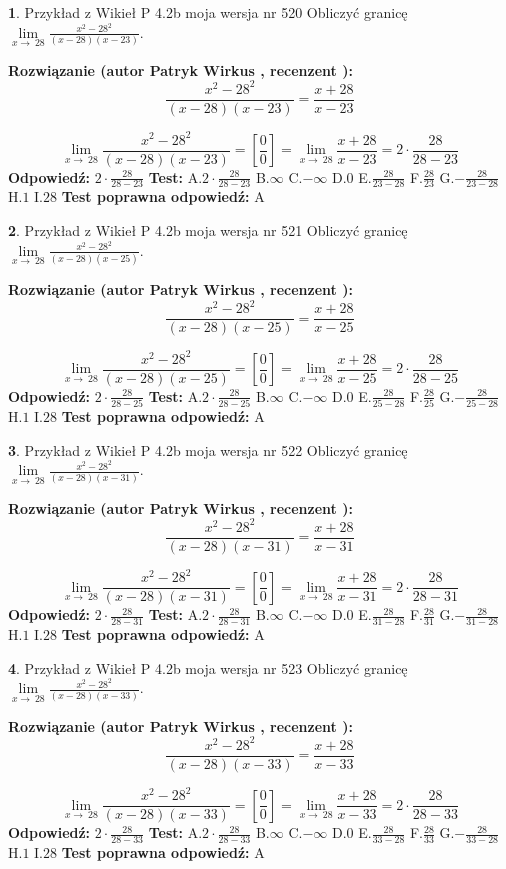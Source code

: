 \documentclass[12pt, a4paper]{article}
\theoremstyle{definition} %
\newtheorem{zad}{}
\newcommand{\zadStart}[1]{\begin{zad}#1\newline}
\newcommand{\zadStop}{\end{zad}}
\newcommand{\rozwStart}[2]{\noindent \textbf{Rozwiązanie (autor #1 , recenzent #2): }\newline}
\newcommand{\rozwStop}{\newline}
\newcommand{\odpStart}{\noindent \textbf{Odpowiedź:}\newline}
\newcommand{\odpStop}{\newline}
\newcommand{\testStart}{\noindent \textbf{Test:}\newline}
\newcommand{\testStop}{\newline}
\newcommand{\kluczStart}{\noindent \textbf{Test poprawna odpowiedź:}\newline}
\newcommand{\kluczStop}{\newline}
\begin{document}
\zadStart{Przykład z Wikieł P 4.2b moja wersja nr 520}
Obliczyć granicę $\lim\limits_{x\to\ 28}\frac{x^{2}-28^{2}}{(x-28)(x-23)}$.
\zadStop
\rozwStart{Patryk Wirkus}{}
$$\frac{x^{2}-28^{2}}{(x-28)(x-23)}=\frac{x+28}{x-23}$$

$$\lim\limits_{x\to\ 28}\frac{x^{2}-28^{2}}{(x-28)(x-23)}=[\frac{0}{0}]=\lim\limits_{x\to\ 28}\frac{x+28}{x-23}=2 \cdot \frac{28}{28-23}$$
\rozwStop
\odpStart
$2 \cdot \frac{28}{28-23}$
\odpStop
\testStart
A.$2 \cdot \frac{28}{28-23}$
B.$\infty$
C.$-\infty$
D.$0$
E.$\frac{28}{23-28}$
F.$\frac{28}{23}$
G.$-\frac{28}{23-28}$
H.$1$
I.$28$
\testStop
\kluczStart
A
\kluczStop



\zadStart{Przykład z Wikieł P 4.2b moja wersja nr 521}
Obliczyć granicę $\lim\limits_{x\to\ 28}\frac{x^{2}-28^{2}}{(x-28)(x-25)}$.
\zadStop
\rozwStart{Patryk Wirkus}{}
$$\frac{x^{2}-28^{2}}{(x-28)(x-25)}=\frac{x+28}{x-25}$$

$$\lim\limits_{x\to\ 28}\frac{x^{2}-28^{2}}{(x-28)(x-25)}=[\frac{0}{0}]=\lim\limits_{x\to\ 28}\frac{x+28}{x-25}=2 \cdot \frac{28}{28-25}$$
\rozwStop
\odpStart
$2 \cdot \frac{28}{28-25}$
\odpStop
\testStart
A.$2 \cdot \frac{28}{28-25}$
B.$\infty$
C.$-\infty$
D.$0$
E.$\frac{28}{25-28}$
F.$\frac{28}{25}$
G.$-\frac{28}{25-28}$
H.$1$
I.$28$
\testStop
\kluczStart
A
\kluczStop



\zadStart{Przykład z Wikieł P 4.2b moja wersja nr 522}
Obliczyć granicę $\lim\limits_{x\to\ 28}\frac{x^{2}-28^{2}}{(x-28)(x-31)}$.
\zadStop
\rozwStart{Patryk Wirkus}{}
$$\frac{x^{2}-28^{2}}{(x-28)(x-31)}=\frac{x+28}{x-31}$$

$$\lim\limits_{x\to\ 28}\frac{x^{2}-28^{2}}{(x-28)(x-31)}=[\frac{0}{0}]=\lim\limits_{x\to\ 28}\frac{x+28}{x-31}=2 \cdot \frac{28}{28-31}$$
\rozwStop
\odpStart
$2 \cdot \frac{28}{28-31}$
\odpStop
\testStart
A.$2 \cdot \frac{28}{28-31}$
B.$\infty$
C.$-\infty$
D.$0$
E.$\frac{28}{31-28}$
F.$\frac{28}{31}$
G.$-\frac{28}{31-28}$
H.$1$
I.$28$
\testStop
\kluczStart
A
\kluczStop



\zadStart{Przykład z Wikieł P 4.2b moja wersja nr 523}
Obliczyć granicę $\lim\limits_{x\to\ 28}\frac{x^{2}-28^{2}}{(x-28)(x-33)}$.
\zadStop
\rozwStart{Patryk Wirkus}{}
$$\frac{x^{2}-28^{2}}{(x-28)(x-33)}=\frac{x+28}{x-33}$$

$$\lim\limits_{x\to\ 28}\frac{x^{2}-28^{2}}{(x-28)(x-33)}=[\frac{0}{0}]=\lim\limits_{x\to\ 28}\frac{x+28}{x-33}=2 \cdot \frac{28}{28-33}$$
\rozwStop
\odpStart
$2 \cdot \frac{28}{28-33}$
\odpStop
\testStart
A.$2 \cdot \frac{28}{28-33}$
B.$\infty$
C.$-\infty$
D.$0$
E.$\frac{28}{33-28}$
F.$\frac{28}{33}$
G.$-\frac{28}{33-28}$
H.$1$
I.$28$
\testStop
\kluczStart
A
\kluczStop
\end{document}

